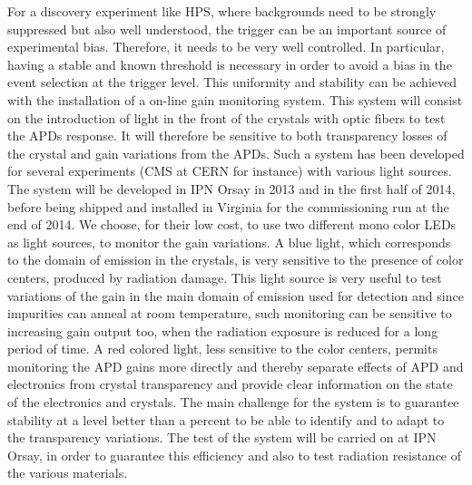 For a discovery experiment like HPS, where backgrounds need to be strongly suppressed but also well understood, the trigger can be an important source of experimental bias. Therefore, it needs to be very well controlled. In particular, having a stable and known threshold is necessary in order to avoid a bias in the event selection at the trigger level. This uniformity and stability can be achieved with the installation of a on-line gain monitoring system. This system will consist on the introduction of light in the front of the crystals with optic fibers to test the APDs response. It will therefore be sensitive to both transparency losses of the crystal and gain variations from the APDs. Such a system has been developed for several experiments (CMS at CERN for instance) with various light sources. The system will be developed in IPN Orsay in 2013 and in the first half of 2014, before being shipped and installed in Virginia for the commissioning run at the end of 2014. We choose, for their low cost, to use two different mono color LEDs as light sources, to monitor the gain variations. A blue light, which corresponds to the domain of emission in the crystals, is very sensitive to the presence of color centers, produced by radiation damage. This light source is very useful to test variations of the gain in the main domain of emission used for detection and since impurities can anneal at room temperature, such monitoring can be sensitive to increasing gain output too, when the radiation exposure is reduced for a long period of time. A red colored light, less sensitive to the color centers, permits monitoring the APD gains more directly and thereby separate effects of APD and electronics from crystal transparency and provide clear information on the state of the electronics and crystals. The main challenge for the system is to guarantee stability at a level better than a percent to be able to identify and to adapt to the transparency variations. The test of the system will be carried on at IPN Orsay, in order to guarantee this efficiency and also to test radiation resistance of the various materials.

